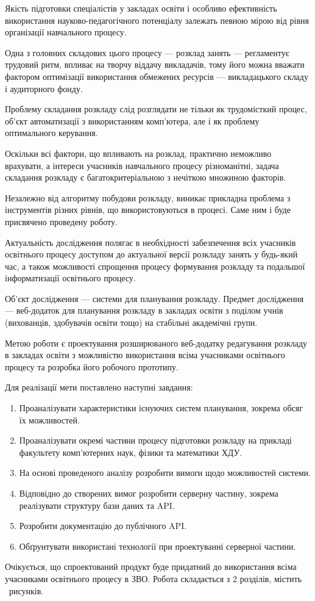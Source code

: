 
Якість підготовки спеціалістів у закладах освіти і особливо ефективність використання науково-педагогічного потенціалу залежать певною мірою від рівня організації навчального процесу.

Одна з головних складових цього процесу — розклад занять — регламентує трудовий ритм, впливає на творчу віддачу викладачів, тому його можна вважати фактором оптимізації використання обмежених ресурсів — викладацького складу і аудиторного фонду.

Проблему складання розкладу слід розглядати не тільки як трудомісткий процес, об'єкт автоматизації з використанням комп’ютера, але і як проблему оптимального керування. 

Оскільки всі фактори, що впливають на розклад, практично неможливо врахувати, а інтереси учасників навчального процесу різноманітні, задача складання розкладу є багатокритеріальною з нечіткою множиною факторів.

Незалежно від алгоритму побудови розкладу, виникає прикладна проблема з інструментів різних рівнів, що використовуються в процесі. Саме ним і буде присвячено проведену роботу.

Актуальність дослідження полягає в необхідності забезпечення всіх учасників освітнього процесу доступом до актуальної версії розкладу занять у будь-який час, а також можливості спрощення процесу формування розкладу та подальшої інформатизації освітнього процесу.

Об’єкт дослідження — системи для планування розкладу. Предмет дослідження —  веб-додаток для планування розкладу в закладах освіти з поділом учнів (вихованців, здобувачів освіти тощо) на стабільні академічні групи.

Метою роботи є проектування розширюваного веб-додатку редагування розкладу в закладах освіти з можливістю використання всіма учасниками освітнього процесу та розробка його робочого прототипу.

Для реалізації мети поставлено наступні завдання:
\begin{enumerate}
	\item Проаналізувати характеристики існуючих систем планування, зокрема обсяг їх можливостей.
	\item Проаналізувати окремі частини процесу підготовки розкладу на прикладі факультету комп'ютерних наук, фізики та математики ХДУ.
	\item На основі проведеного аналізу розробити вимоги щодо можливостей системи.
	\item Відповідно до створених вимог розробити серверну частину, зокрема реалізувати структуру бази даних та API.
	\item Розробити документацію до публічного API.
	\item Обґрунтувати використані технології при проектуванні серверної частини.
\end{enumerate}

Очікується, що спроектований продукт буде придатний до використання всіма учасниками освітнього процесу в ЗВО.
Робота складається з 2 розділів, містить \totalfigures\ рисунків. 

